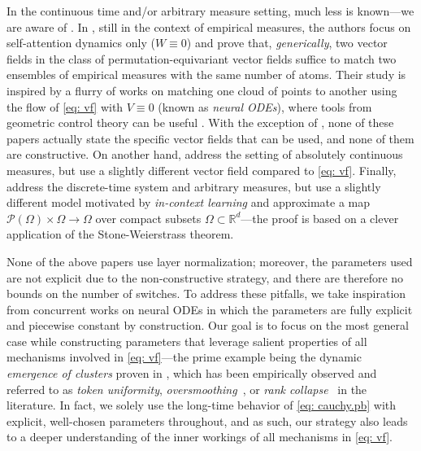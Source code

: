 \documentclass[a4paper,11pt]{article}
\theoremstyle{plain}
\newcommand{\bW}{\bm{\mathit{W}}}
\newcommand{\bV}{\bm{\mathit{V}}}
\numberwithin{equation}{section}
\begin{document}
In the continuous time and/or arbitrary measure setting, much less is known---we are aware of \cite{adu2024approximate, agrachev2024generic, furuya2024transformers}. In \cite{agrachev2024generic}, still in the context of empirical measures, the authors focus on self-attention dynamics only (\(\bW \equiv 0\)) and prove that, \emph{generically}, two vector fields in the class of permutation-equivariant vector fields suffice to match two ensembles of empirical measures with the same number of atoms.
Their study is inspired by a flurry of works on matching one cloud of points to another using the flow of \eqref{eq: vf} with \(\bV \equiv 0\) (known as \emph{neural ODEs}), where tools from geometric control theory can be useful \cite{agrachev2020control, agrachev2022control, scagliotti2021deep, elamvazhuthi2022neural, tabuada2022universal}.
With the exception of \cite{tabuada2022universal, elamvazhuthi2022neural}, none of these papers actually state the specific vector fields that can be used, and none of them are constructive.
On another hand, \cite{adu2024approximate} address the setting of absolutely continuous measures, but use a slightly different vector field compared to \eqref{eq: vf}. 
Finally, \cite{furuya2024transformers} address the discrete-time system and arbitrary measures, but use a slightly different model motivated by \emph{in-context learning} \cite{garg2022can} and approximate a map \( \mathscr{P}(\Omega) \times \Omega \to \Omega \) over compact subsets $\Omega\subset\mathbb{R}^d$---the proof is based on a clever application of the Stone-Weierstrass theorem.

None of the above papers use layer normalization; moreover, the parameters used are not explicit due to the non-constructive strategy, and there are therefore no bounds on the number of switches. 
To address these pitfalls, we take inspiration from concurrent works on neural ODEs \cite{li2022deep, ruiz2023neural, cheng2023interpolation} in which the parameters are fully explicit and piecewise constant by construction. Our goal is to focus on the most general case while constructing parameters that leverage  salient properties of all mechanisms involved in \eqref{eq: vf}---the prime example being the dynamic \emph{emergence of clusters} proven in \cite{geshkovski2024emergence, geshkovski2023mathematical}, which has been empirically observed and referred to as \emph{token uniformity}, \emph{oversmoothing}~\cite{chen2022principle, ru2023token, guo2023contranorm, wu2024demystifying, wu2024role, dovonon2024setting, scholkemper2024residual}, or \emph{rank collapse}~\cite{dong2021attention, feng2022rank, noci2022signal, joudaki2023impact, zhao2023are, zhai2023stabilizing, noci2024shaped, bao2024self, cowsik2024geometric} in the literature. 
In fact, we solely use the long-time behavior of \eqref{eq: cauchy.pb} with explicit, well-chosen parameters throughout, and as such, our strategy also leads to a deeper understanding of the inner workings of all mechanisms in \eqref{eq: vf}.
\end{document}
